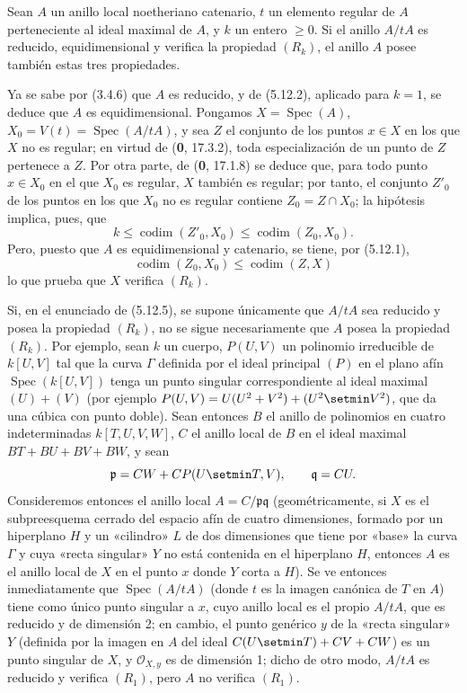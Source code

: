 \begin{proposition}[5.12.5]
\label{IV.2.s5.12.5-fr}
Sean $A$ un anillo local noetheriano catenario, $t$ un elemento regular de $A$
perteneciente al ideal maximal de $A$, y $k$ un entero $\geq0$. Si el anillo
$A/tA$ es reducido, equidimensional y verifica la propiedad $(R_k)$, el anillo
$A$ posee también estas tres propiedades.
\end{proposition}

Ya se sabe por (3.4.6) que $A$ es reducido, y de (5.12.2), aplicado para
$k=1$, se deduce que $A$ es equidimensional. Pongamos
$X=\operatorname{Spec}(A)$, $X_0=V(t)=\operatorname{Spec}(A/tA)$, y sea $Z$
el conjunto de los puntos $x\in X$ en los que $X$ no es regular; en virtud de
(\textbf{0}, 17.3.2), toda especialización de un punto de $Z$ pertenece a $Z$. Por otra
parte, de (\textbf 0, 17.1.8) se deduce que, para todo punto $x\in X_0$ en el que $X_0$
es regular, $X$ también es regular; por tanto, el conjunto $Z'_0$ de los puntos
en los que $X_0$ no es regular contiene $Z_0=Z\cap X_0$; la hipótesis implica,
pues, que
\[
k\leq\operatorname{codim}(Z'_0,X_0)\leq\operatorname{codim}(Z_0,X_0).
\]
Pero, puesto que $A$ es equidimensional y catenario, se tiene, por (5.12.1),
\[
\operatorname{codim}(Z_0,X_0)\leq\operatorname{codim}(Z,X)
\]
lo que prueba que $X$ verifica $(R_k)$.

\begin{remark}[5.12.6]
\label{IV.2.s5.12.6-fr}
Si, en el enunciado de (5.12.5), se supone únicamente que $A/tA$ sea reducido y
posea la propiedad $(R_k)$, no se sigue necesariamente que $A$ posea la
propiedad $(R_k)$. Por ejemplo, sean $k$ un cuerpo, $P(U,V)$ un polinomio
irreducible de $k[U,V]$ tal que la curva $\Gamma$ definida por el ideal
principal $(P)$ en el plano afín $\operatorname{Spec}(k[U,V])$ tenga un punto
singular correspondiente al ideal maximal $(U)+(V)$ (por ejemplo
$P(U,V)=U(U^2+V^2)+(U^2\setmin V^2)$, que da una cúbica con punto doble). Sean entonces
$B$ el anillo de polinomios en cuatro indeterminadas $k[T,U,V,W]$, $C$ el anillo
local de $B$ en el ideal maximal $BT+BU+BV+BW$, y sean
\[
\mathfrak p=CW+CP(U\setmin T,V),\qquad \mathfrak q=CU.
\]
Consideremos entonces el anillo local $A=C/\mathfrak p\mathfrak q$
(geométricamente, si $X$ es el subpreesquema cerrado del espacio afín de cuatro
dimensiones, formado por un hiperplano $H$ y un «cilindro» $L$ de dos dimensiones
que tiene por «base» la curva $\Gamma$ y cuya «recta singular» $Y$ no está
contenida en el hiperplano $H$, entonces $A$ es el anillo local de $X$ en el
punto $x$ donde $Y$ corta a $H$). Se ve entonces inmediatamente que
$\operatorname{Spec}(A/tA)$ (donde $t$ es la imagen canónica de $T$ en $A$)
tiene como único punto singular a $x$, cuyo anillo local es el propio $A/tA$,
que es reducido y de dimensión 2; en cambio, el punto genérico $y$ de la
«recta singular» $Y$ (definida por la imagen en $A$ del ideal
$C(U\setmin T)+CV+CW$) es un punto singular de $X$, y
$\mathcal O_{X,y}$ es de dimensión 1; dicho de otro modo, $A/tA$ es reducido y
verifica $(R_1)$, pero $A$ no verifica $(R_1)$.
\end{remark}


